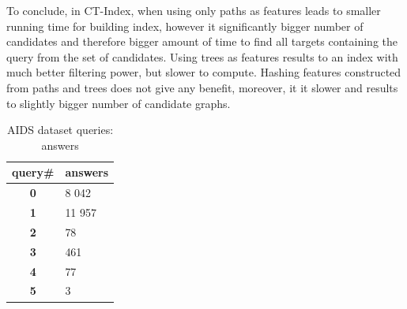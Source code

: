 \documentclass{l4proj}
\theoremstyle{definition}
\begin{document}
To conclude, in CT-Index, when using only paths as features leads to smaller running time for building index, however it significantly bigger number of candidates and therefore bigger amount of time to find all targets containing the query from the set of candidates. Using trees as features results to an index with much better filtering power, but slower to compute. Hashing features constructed from paths and trees does not give any benefit, moreover, it it slower and results to slightly bigger number of candidate graphs.\par
\begin{table}[H]
\caption{AIDS dataset queries: answers}
\label{table:answers}
\begin{center}
\begin{tabular}{ |c|l| } 
 \hline
 query\# & answers\\
\hline
 \textbf{0} &  8 042  \\ 
 \hline
 \textbf{1} & 11 957 \\ 
 \hline
 \textbf{2} & 78  \\ 
 \hline
 \textbf{3} & 461  \\ 
 \hline
 \textbf{4} & 77\\ 
 \hline
 \textbf{5} & 3\\ 
 \hline
\end{tabular}
\end{center}        
\end{table}        


    
\end{document}
